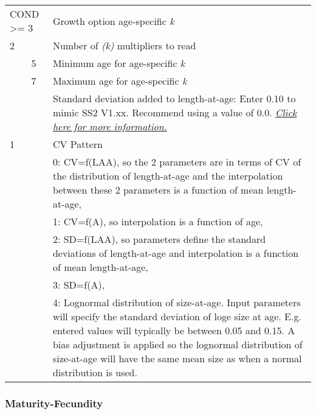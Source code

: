 \begin{longtable}{p{0.5cm} p{2cm} p{12cm}}
	\multicolumn{2}{l}{COND >= 3} & Growth option age-specific \textit{k} \Tstrut\\
	2 & & Number of \textit{(k)} multipliers to read\\
	& 5 & Minimum age for age-specific \textit{k}\\
	& 7 & Maximum age for age-specific \textit{k}\Bstrut\\
	\hline

	\Tstrut 0 & & Standard deviation added to length-at-age: Enter 0.10 to mimic SS2 V1.xx. Recommend using a value of 0.0.  \hyperlink{A1}{\textit{Click here for more information.}}\Bstrut\\
	\hline

	1 & & CV Pattern \Tstrut\\
	  & & 0: CV=f(LAA), so the 2 parameters are in terms of CV of the distribution of length-at-age and the interpolation between these 2 parameters is a function of mean length-at-age,\\
	  & & 1: CV=f(A), so interpolation is a function of age,\\
	  & & 2: SD=f(LAA), so parameters define the standard deviations of length-at-age and interpolation is a function of mean length-at-age,\\
	  & & 3: SD=f(A), \\
	  & & 4: Lognormal distribution of size-at-age.  Input parameters will specify the standard deviation of loge size at age.  E.g. entered values will typically be between 0.05 and 0.15.  A bias adjustment is applied so the lognormal distribution of size-at-age will have the same mean size as when a normal distribution is used.\Bstrut\\
	\hline
\end{longtable}


\subsubsection{Maturity-Fecundity}

